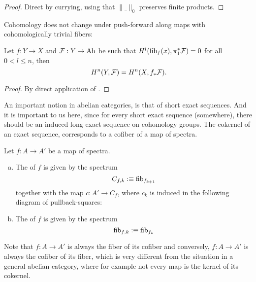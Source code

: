 \begin{proof}
  Direct by currying, using that $\|\_\|_0$ preserves finite products.
\end{proof}

Cohomology does not change under push-forward along maps with cohomologically trivial fibers:

\begin{lemma}
  \label{cohomologically-trivial-fibers}
  Let $f:Y\to X$ and $\mathcal F:Y\to\operatorname{Ab}$ be such that $H^l(\mathrm{fib}_f(x),\pi_1^\ast\mathcal F)=0$ for all $0<l\leq n$,
  then
  \[
    H^n(Y,\mathcal F)=H^n(X,f_\ast\mathcal F)
    \rlap{.}
  \]
\end{lemma}

\begin{proof}
  By direct application of .
\end{proof}

An important notion in abelian categories, is that of short exact sequences.
And it is important to us here, since for every short exact sequence (somewhere), there should be an induced long exact sequence on cohomology groups.
The cokernel of an exact sequence, corresponds to a cofiber of a map of spectra.

\begin{definition}
  Let $f:A\to A'$ be a map of spectra.
  \begin{enumerate}[(a)]
  \item The  of $f$ is given by the spectrum
    \[ C_{f,k}:\equiv \mathrm{fib}_{f_{k+1}}\]
    together with the map $c:A'\to C_f$, where $c_k$ is induced in the following diagram of pullback-squares:
    \begin{center}
    \end{center}
  \item The  of $f$ is given by the spectrum
    \[ \mathrm{fib}_{f,k}:\equiv \mathrm{fib}_{f_k}\]
  \end{enumerate}
\end{definition}

Note that $f:A\to A'$ is always the fiber of its cofiber and conversely, $f:A\to A'$ is always the cofiber of its fiber, which is very different from the situation in a general abelian category,
where for example not every map is the kernel of its cokernel.

